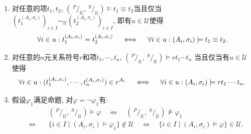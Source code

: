 \begin{enumerate}
    \item 对任意的项$t_1,t_2$,
    $\left(\,^{\displaystyle P}\!/_{\displaystyle\mathcal{U}},\,^{\displaystyle S}
    \!/_{\displaystyle\mathcal{U}}\right)\models t_1\equiv t_2$当且仅当$(t_1^
    {(A_i,\sigma_i)})_{i\in I}\sim_{\mathcal{U}}(t_2^{(A_i,\sigma_i)})_{i\in I}$,
    即有$u\in\mathcal{U}$使得
    \vspace{3pt}
    \[
        \forall i\in u:t_1^{(A_i,\sigma_i)}=t_2^{(A_i,\sigma_i)}\quad\iff\quad
        \forall i\in u:(A_i,\sigma_i)\models t_1\equiv t_2.\\[3pt]
    \]

    \item 对任意的$n$元关系符号$r$和项$t_1,\cdots,t_n$,
    $\left(\,^{\displaystyle P}\!/_{\displaystyle\mathcal{U}},\,^{\displaystyle S}
    \!/_{\displaystyle\mathcal{U}}\right)\models rt_1\cdots t_n$
    当且仅当有$u\in\mathcal{U}$使得
    \vspace{3pt}
    \[
        \forall i\in u:(t_1^{(A_i,\sigma_i)},\cdots,t_n^{(A_i,\sigma_i)})\in r^{A_i}
        \quad\iff\quad\forall i\in u:(A_i,\sigma_i)\models rt_1\cdots t_n.\\[3pt]
    \]

    \item 假设$\varphi_1$满足命题, 对$\varphi=\neg\varphi_1$有:
    \vspace{5pt}
    \[\begin{aligned}
        &\left(\,^{\displaystyle P}\!/_{\displaystyle\mathcal{U}},\,
        ^{\displaystyle S}\!/_{\displaystyle\mathcal{U}}\right)\models\varphi
        \quad\iff\quad\left(\,^{\displaystyle P}\!/_{\displaystyle\mathcal{U}},\,
        ^{\displaystyle S}\!/_{\displaystyle\mathcal{U}}\right)\not\models\varphi_1\\
        \quad\iff\quad&\{i\in I\mid(A_i,\sigma_i)\models\varphi_1\}\notin\mathcal{U}
        \quad\iff\quad\{i\in I\mid(A_i,\sigma_i)\models\varphi\}\in\mathcal{U}.\\[3pt]
    \end{aligned}\]


\end{enumerate}
